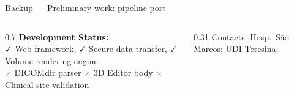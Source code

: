 \documentclass[aspectratio=169,11pt,xcolor=table]{beamer}
\begin{document}
\begin{frame}{Backup --- Preliminary work: pipeline port}
\vspace{0.15cm}
\begin{columns}[T]
\begin{column}{0.7\linewidth}
  \textbf{Development Status:} \\
  \textcolor{accent}{$\checkmark$} Web framework,
  \textcolor{accent}{$\checkmark$} Secure data transfer,
  \textcolor{accent}{$\checkmark$} Volume rendering engine \\
  \textcolor{gray}{$\times$} DICOMdir parser \quad
  \textcolor{gray}{$\times$} 3D Editor body \quad
  \textcolor{gray}{$\times$} Clinical site validation
\end{column}
\begin{column}{0.31\linewidth}
  \raggedleft
  \color{gray}\tiny
  Contacts: Hosp.\ São Marcos; UDI Teresina; 
\end{column}
\end{columns}
\end{frame}
\end{document}
